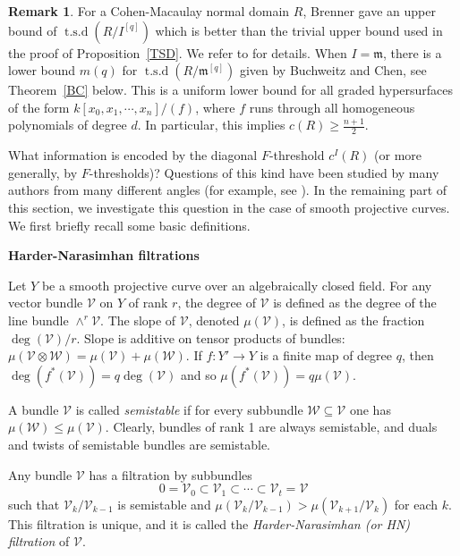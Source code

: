 \documentclass[draft]{amsart}
\theoremstyle{definition}
\newtheorem{remark}[theorem]{Remark}
\numberwithin{equation}{theorem}
\begin{document}
\begin{remark}
For a Cohen-Macaulay normal domain $R$, Brenner gave an upper bound of ${\operatorname{t.s.d}} (R/I^{[q]})$ which is better than the trivial upper bound used in the proof of Proposition~\ref{TSD}. We refer to \cite{B1} for details. When $I={\mathfrak{m}}$, there is a lower bound $m(q)$ for ${\operatorname{t.s.d}} (R/{\mathfrak{m}}^{[q]})$ given by Buchweitz and Chen, see Theorem~\ref{BC} below. This is a uniform lower bound for all graded hypersurfaces of the form  $k[x_0,x_1, \cdots, x_n]/(f)$, where $f$ runs through all homogeneous polynomials of degree $d$. In particular, this implies $c(R)\geq \frac{n+1}{2}$.
\end{remark}

What information is encoded by the diagonal $F$-threshold $c^I(R)$ (or more generally, by $F$-thresholds)? Questions of this kind have been studied by many authors from many different angles (for example, see \cite{HMTW, HTW}). In the remaining part of this section, we investigate this question in the case of smooth projective curves. We first briefly recall some basic definitions.

{\bf{Harder-Narasimhan filtrations}}

Let $Y$ be a smooth projective curve over an algebraically closed
field. For any vector bundle ${\mathcal{V}}$ on $Y$ of rank $r$, the degree of ${\mathcal{V}}$ is defined as the degree of the line bundle $\wedge^r {\mathcal{V}}$. The 
slope of ${\mathcal{V}}$, denoted $\mu({\mathcal{V}})$, is defined as the fraction $\deg({\mathcal{V}})/r$. Slope is additive on tensor products of bundles: $\mu({\mathcal{V}} \otimes {\mathcal{W}})=
\mu({\mathcal{V}})+\mu({\mathcal{W}})$. If $f: Y'{\longrightarrow} Y$ is a finite map of degree $q$,
then $\deg (f^*({\mathcal{V}}))=q\deg({\mathcal{V}})$ and so $\mu(f^*({\mathcal{V}}))=q\mu({\mathcal{V}}).$

A bundle ${\mathcal{V}}$ is called \emph{semistable} if for every subbundle
${\mathcal{W}}\subseteq {\mathcal{V}}$ one has $\mu({\mathcal{W}}) \leq \mu({\mathcal{V}})$. Clearly,
bundles of rank 1 are always semistable, and duals and twists of
semistable bundles are semistable.

Any bundle ${\mathcal{V}}$ has a filtration by subbundles
\[
0={\mathcal{V}}_0 \subset {\mathcal{V}}_1 \subset \cdots \subset {\mathcal{V}}_t={\mathcal{V}}
\]
such that ${\mathcal{V}}_k/{\mathcal{V}}_{k-1}$ is semistable and $\mu({\mathcal{V}}_k/{\mathcal{V}}_{k-1}) >
\mu({\mathcal{V}}_{k+1}/{\mathcal{V}}_k)$ for each $k$. This filtration is unique, and
it is called the \emph{Harder-Narasimhan (or HN) filtration} of ${\mathcal{V}}$.
\end{document}
